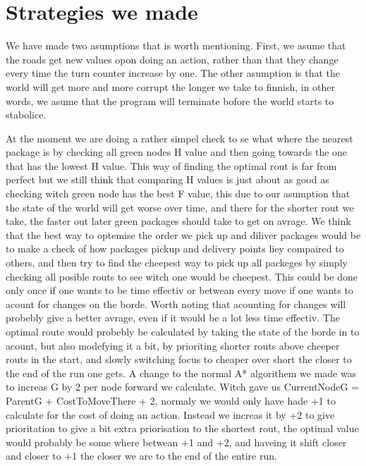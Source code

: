 \documentclass[12pt, a4paper]{article}
\begin{document}


\section{Strategies we made}
We have made two asumptions that is worth mentioning. First, we asume that the roads get new values opon doing an action, rather than that they change every time the turn counter increase by one. The other asumption is that the world will get more and more corrupt the longer we take to finnish, in other words, we asume that the program will terminate bofore the world starts to stabolice.

At the moment we are doing a rather simpel check to se what where the nearest package is by checking all green nodes H value and then going towards the one that has the lowest H value. This way of finding the optimal rout is far from perfect but we still think that comparing H values is just about as good as checking witch green node has the best F value, this due to our asumption that the state of the world will get worse over time, and there for the shorter rout we take, the faster out later green packages should take to get on avrage.
We think that the best way to optemise the order we pick up and diliver packages would be to make a check of how packages pickup and delivery points liey compaired to others, and then try to find the cheepest way to pick up all packeges by simply checking all posible routs to see witch one would be cheepest. This could be done only once if one wants to be time effectiv or betwean every move if one wants to acount for changes on the borde. Worth noting that acounting for changes will probebly give a better avrage, even if it would be a lot less time effectiv. The optimal route would probebly be calculated by taking the state of the borde in to acount, but also modefying it a bit, by prioriting shorter routs above cheeper routs in the start, and slowly switching focus to cheaper over short the closer to the end of the run one gets.
A change to the normal A* algorithem we made was to increas G by 2 per node forward we calculate. Witch gave us CurrentNodeG = ParentG + CostToMoveThere + 2, normaly we would only have hade +1 to calculate for the cost of doing an action. Instead we increas it by +2 to give prioritation to give a bit extra priorisation to the shortest rout, the optimal value would probably be some where betwean +1 and +2, and haveing it shift closer and closer to +1 the closer we are to the end of the entire run.
\end{document}
